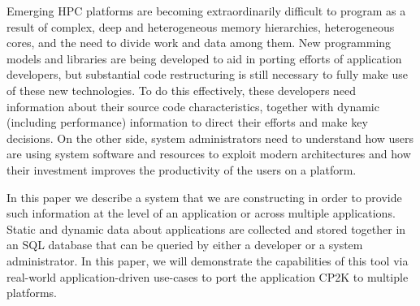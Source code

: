 Emerging HPC platforms are becoming extraordinarily difficult to program as a result of complex, deep  and heterogeneous memory hierarchies, heterogeneous cores, and the need to divide work and data among them.
New programming models and libraries are being developed to aid in porting efforts of application developers, but substantial code restructuring is still necessary to fully make use of these new technologies.
To do this effectively, these developers need information about their source code characteristics, together with dynamic (including performance) information to direct their efforts and make key decisions.
On the other side, system administrators need to understand how users are using system software and resources to exploit modern architectures and how their investment improves the productivity of the users on a platform.

In this paper we describe a system that we are constructing in order to provide such information at the level of an application or across multiple applications.
Static and dynamic data about applications are collected and stored together in an \acs{SQL} database that can be queried by either a developer or a system administrator. In this paper, we will demonstrate the capabilities of this tool via real-world application-driven use-cases to port the application CP2K to multiple platforms.
